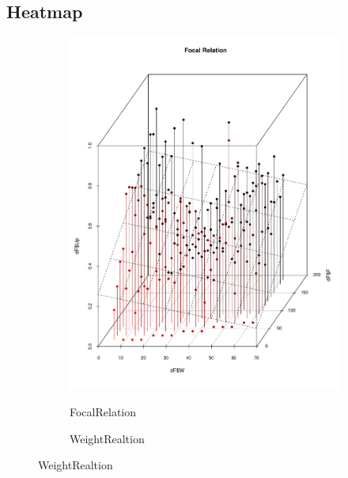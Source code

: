 \documentclass{itatnew}
\begin{document}
\subsection{Heatmap}
\begin{figure}[htp]
  \begin{subfigure}{\linewidth}
    \caption{FocalRelation}
    \includegraphics[width=\linewidth]{images/FocalRealationUp}
    \label{fig:FocalRelation}
  \end{subfigure}
  \hspace{1em}
  \begin{subfigure}{\linewidth}
    \caption{WeightRealtion}

\end{subfigure}
\end{figure}
\end{document}
